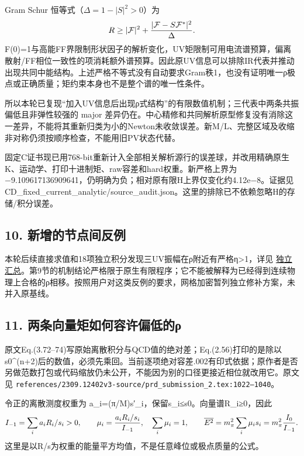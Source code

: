 \documentclass[
  10pt,
  a4paper,
]{article}
\begin{document}
Gram Schur 恒等式（\(\Delta=1-|S|^2>0\)）为 \[
R\ge |\mathcal F|^2+{|\mathcal F-S\mathcal F^*|^2\over\Delta}.
\]
F(0)=1与高能FF界限制形状因子的解析变化，UV矩限制可用电流谱预算，偏离散射/FF相位一致性的项消耗额外谱预算。因此原UV信息可以排除IR代表并推动出现共同中能结构。上述严格不等式没有自动要求Gram秩1，也没有证明唯一ρ极点或正确质量；矩约束本身也不是整个谱的唯一性条件。

所以本轮已复现``加入UV信息后出现ρ式结构''的有限数值机制；三代表中两条共振偏低且非弹性较强的
major
差异仍在。中心精修和共同解析原型修复没有消除这一差异，不能将其重新归类为小的Newton未收敛误差。新M/L、完整区域及收缩非对称仍须按顺序检查，不能用旧PV状态代替。

固定C证书现已用768-bit重新计入全部相关解析源行的误差球，并改用精确原生K、运动学、打印十进制矩、raw容差和hard权重。新严格上界为
−9.109617136909641，仍明确为负；相对原有限H上界仅变化约4.12e−8。证据见
CD\_fixed\_current\_analytic/source\_audit.json。这里的排除已不依赖忽略H的存储/积分误差。

\subsection{10.
新增的节点间反例}\label{ux65b0ux589eux7684ux8282ux70b9ux95f4ux53cdux4f8b}

本轮后续直接求值和18项独立积分发现三UV振幅在ρ附近有严格η\textgreater1，详见
\href{../../sequential_reproduction_20260910/HELD_INTER_NODE_ISSUE_ZH.md}{独立汇总}。第9节的机制结论严格限于原生有限程序；它不能被解释为已经得到连续物理上合格的ρ相移。按照用户对这类反例的要求，网格加密暂列独立修补方案，未并入原基线。

\subsection{11.
两条向量矩如何容许偏低的ρ}\label{ux4e24ux6761ux5411ux91cfux77e9ux5982ux4f55ux5bb9ux8bb8ux504fux4f4eux7684ux3c1}

原文Eq.(3.72--74)写原始离散积分与QCD值的绝对差；Eq.(2.56)打印的是除以s0\^{}(n+2)后的数值，必须先乘回。当前逐项绝对容差.002有印式依据；原作者是否另做范数打包或代码缩放仍未公开，不能因为别的口径更接近相位就改用它。原文见
\texttt{references/2309.12402v3-source/prd\_submission\_2.tex:1022–1040}。

令正的离散测度权重为 a\_i=(π/M)s′\_i，保留s\_i≤s0。向量谱R\_i≥0，因此 \[
I_{-1}=\sum_i a_iR_i/s_i>0,\qquad
\mu_i={a_iR_i/s_i\over I_{-1}},\quad\sum_i\mu_i=1,
\qquad \overline{E^2}=m_\pi^2\sum_i\mu_i s_i=m_\pi^2{I_0\over I_{-1}}.
\] 这里是以R/s为权重的能量平方均值，不是任意峰位或极点质量的公式。
\end{document}
